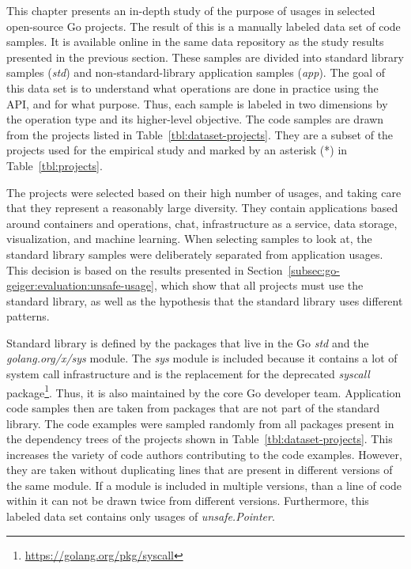 This chapter presents an in-depth study of the purpose of \unsafe{} usages in \projsForLabeledCodeSnippets{} selected
open-source Go projects.
The result of this is a manually labeled data set of \numberLabeledCodeSnippets{} code samples.
It is available online in the same data repository as the study results presented in the previous section.
These samples are divided into \numberLabeledCodeSnippetsStd{} standard library samples (\textit{std}) and
\numberLabeledCodeSnippetsApp{} non-standard-library application samples (\textit{app}).
The goal of this data set is to understand what operations are done in practice using the \unsafe{} \acrshort{API},
and for what purpose.
Thus, each sample is labeled in two dimensions by the operation type and its higher-level objective.
The \numberLabeledCodeSnippets{} code samples are drawn from the projects listed in Table~\ref{tbl:dataset-projects}.
They are a subset of the projects used for the empirical study and marked by an asterisk (*) in
Table~\ref{tbl:projects}.



The projects were selected based on their high number of \unsafe{} usages, and taking care that they represent a
reasonably large diversity.
They contain applications based around containers and operations, chat, infrastructure as a service, data storage,
visualization, and machine learning.
When selecting samples to look at, the standard library samples were deliberately separated from application usages.
This decision is based on the results presented in Section~\ref{subsec:go-geiger:evaluation:unsafe-usage}, which show
that all projects must use the standard library, as well as the hypothesis that the standard library uses different
\unsafe{} patterns.

Standard library is defined by the packages that live in the Go \textit{std} and the \textit{golang.org/x/sys} module.
The \textit{sys} module is included because it contains a lot of system call infrastructure and is the replacement for
the deprecated \textit{syscall} package\footnote{\url{https://golang.org/pkg/syscall}}.
Thus, it is also maintained by the core Go developer team.
Application code samples then are taken from packages that are not part of the standard library.
The \numberLabeledCodeSnippets{} code examples were sampled randomly from all packages present in the dependency trees
of the projects shown in Table~\ref{tbl:dataset-projects}.
This increases the variety of code authors contributing to the code examples.
However, they are taken without duplicating lines that are present in different versions of the same module.
If a module is included in multiple versions, than a line of code within it can not be drawn twice from different
versions.
Furthermore, this labeled data set contains only usages of \textit{unsafe.Pointer}.

